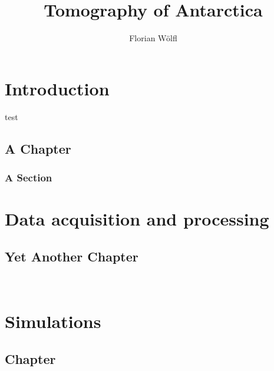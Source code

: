 \documentclass[
  twoside,
  11pt, a4paper,
  footinclude=true,
  headinclude=true,
  cleardoublepage=empty
]{scrbook}
\title{Tomography of Antarctica}
\author{Florian W\"olfl}
\begin{document}
\maketitle







\part{Introduction}
test


\chapter{A Chapter}
\lipsum[1] %

\section{A Section}


\part{Data acquisition and processing}

\chapter{Yet Another Chapter}

  
\
\part{Simulations}
\chapter{ Chapter}
\lipsum[1]
    
\end{document}
